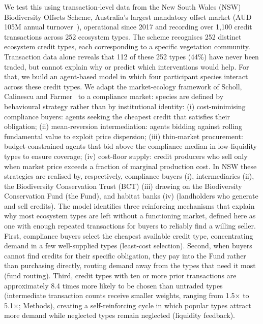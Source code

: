 \documentclass[pdflatex,sn-nature,oneside]{sn-jnl}
\begin{document}
We test this using transaction-level data from the New South Wales (NSW)
Biodiversity Offsets Scheme, Australia's largest mandatory offset market
(AUD\,105M annual turnover~\cite{IPART2024}), operational since 2017
and recording over 1,100 credit transactions across 252 ecosystem types.
The scheme recognises 252 distinct ecosystem credit types, each corresponding
to a specific vegetation community.
Transaction data alone reveals that 112 of these 252 types (44\%) have never
been traded, but cannot explain why or predict which interventions would help.
For that, we build an agent-based model in which four participant species
interact across these credit types. We adapt the market-ecology framework
of Scholl, Calinescu and Farmer~\cite{SchollCalinescuFarmer2021} to a
compliance market: species are defined by behavioural strategy rather
than by institutional identity:
(i) cost-minimising compliance buyers: agents seeking the cheapest credit
that satisfies their obligation;
(ii) mean-reversion intermediation: agents bidding against rolling
fundamental value to exploit price dispersion;
(iii) thin-market procurement: budget-constrained agents that bid above
the compliance median in low-liquidity types to ensure coverage;
(iv) cost-floor supply: credit producers who sell only when market price
exceeds a fraction of marginal production cost.
In NSW these strategies are realised by, respectively, compliance buyers
(i), intermediaries (ii), the Biodiversity Conservation Trust (BCT) (iii)
drawing on the Biodiversity Conservation Fund (the Fund), and habitat
banks (iv) (landholders who generate and sell credits).
The model identifies three reinforcing mechanisms that explain why most
ecosystem types are left without a functioning market, defined here
as one with enough repeated transactions for buyers to reliably find
a willing seller.
First, compliance buyers select the cheapest available credit type, concentrating
demand in a few well-supplied types (least-cost selection).
Second, when buyers cannot find credits for their specific obligation, they pay
into the Fund rather than purchasing directly, routing demand
away from the types that need it most (fund routing).
Third, credit types with ten or more prior transactions are approximately 8.4
times more likely to be chosen than untraded types (intermediate transaction
counts receive smaller weights, ranging from 1.5$\times$ to 5.1$\times$;
Methods), creating a self-reinforcing cycle in which popular types
attract more demand while neglected types remain neglected (liquidity feedback).
\end{document}

